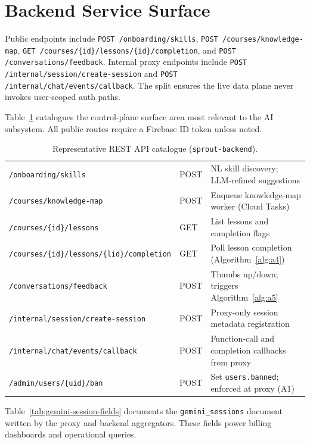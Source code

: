 \section{Backend Service Surface}
\label{sec:backend-api}

Public endpoints include \texttt{POST /onboarding/skills}, \texttt{POST /courses/knowledge-map}, \texttt{GET /courses/\{id\}/lessons/\{id\}/completion}, and \texttt{POST /conversations/feedback}. Internal proxy endpoints include \texttt{POST /internal/session/create-session} and \texttt{POST /internal/chat/events/callback}. The split ensures the live data plane never invokes user-scoped auth paths.

Table~\ref{tab:api-catalogue} catalogues the control-plane surface area most relevant to the AI subsystem. All public routes require a Firebase ID token unless noted.

\tablesetup
\begin{table}[H]
\centering
\caption{Representative REST API catalogue (\texttt{sprout-backend}).}
\label{tab:api-catalogue}
\small
\begin{tabular}{|p{4.6cm}|p{1.2cm}|p{7.5cm}|}
\hline
\chead{Route} & \chead{Verb} & \chead{Purpose} \\
\hline
\texttt{/onboarding/skills} & POST & NL skill discovery; LLM-refined suggestions \\
\texttt{/courses/knowledge-map} & POST & Enqueue knowledge-map worker (Cloud Tasks) \\
\texttt{/courses/\{id\}/lessons} & GET & List lessons and completion flags \\
\texttt{/courses/\{id\}/lessons/\{lid\}/completion} & GET & Poll lesson completion (Algorithm~\ref{alg:a4}) \\
\texttt{/conversations/feedback} & POST & Thumbs up/down; triggers Algorithm~\ref{alg:a5} \\
\texttt{/internal/session/create-session} & POST & Proxy-only session metadata registration \\
\texttt{/internal/chat/events/callback} & POST & Function-call and completion callbacks from proxy \\
\texttt{/admin/users/\{uid\}/ban} & POST & Set \texttt{users.banned}; enforced at proxy (A1) \\
\hline
\end{tabular}
\end{table}

Table~\ref{tab:gemini-session-fields} documents the \texttt{gemini\_sessions} document written by the proxy and backend aggregators. These fields power billing dashboards and operational queries.

